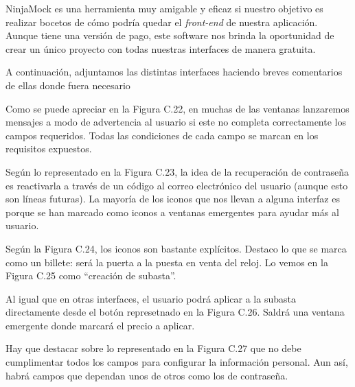 	NinjaMock es una herramienta muy amigable y eficaz si nuestro objetivo es realizar bocetos de cómo podría quedar el \emph{front-end} de nuestra aplicación. Aunque tiene una versión de pago, este software nos brinda la oportunidad de crear un único proyecto con todas nuestras interfaces de manera gratuita.
	
	A continuación, adjuntamos las distintas interfaces haciendo breves comentarios de ellas donde fuera necesario


	Como se puede apreciar en la Figura C.22, en muchas de las ventanas lanzaremos mensajes a modo de advertencia al usuario si este no completa correctamente los campos requeridos. Todas las condiciones de cada campo se marcan en los requisitos expuestos.
	

	Según lo representado en la Figura C.23, la idea de la recuperación de contraseña es reactivarla a través de un código al correo electrónico del usuario (aunque esto son líneas futuras). La mayoría de los iconos que nos llevan a alguna interfaz es porque se han marcado como iconos a ventanas emergentes para ayudar más al usuario.
	

	Según la Figura C.24, los iconos son bastante explícitos. Destaco lo que se marca como un billete: será la puerta a la puesta en venta del reloj. Lo vemos en la Figura C.25 como ``creación de subasta''.



	Al igual que en otras interfaces, el usuario podrá aplicar a la subasta directamente desde el botón represetnado en la Figura C.26. Saldrá una ventana emergente donde marcará el precio a aplicar.
	

	Hay que destacar sobre lo representado en la Figura C.27 que no debe cumplimentar todos los campos para configurar la información personal. Aun así, habrá campos que dependan unos de otros como los de contraseña.
